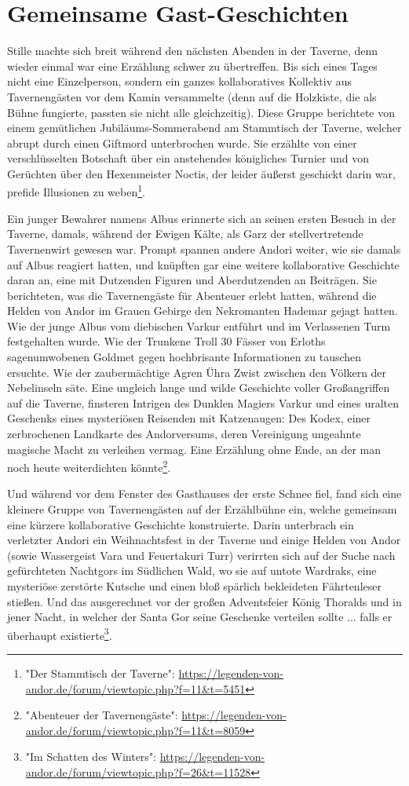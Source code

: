 \section{Gemeinsame Gast-Geschichten}

Stille machte sich breit während den nächsten Abenden in der Taverne, denn wieder einmal war eine Erzählung schwer zu übertreffen. Bis sich eines Tages nicht eine Einzelperson, sondern ein ganzes kollaboratives Kollektiv aus Tavernengästen vor dem Kamin versammelte (denn auf die Holzkiste, die als Bühne fungierte, passten sie nicht alle gleichzeitig). Diese Gruppe berichtete von einem gemütlichen Jubiläums-Sommerabend am Stammtisch der Taverne, welcher abrupt durch einen Giftmord unterbrochen wurde. Sie erzählte von einer verschlüsselten Botschaft über ein anstehendes königliches Turnier und von Gerüchten über den Hexenmeister Noctis, der leider äußerst geschickt darin war, prefide Illusionen zu weben\footnote{"Der Stammtisch der Taverne": \url{https://legenden-von-andor.de/forum/viewtopic.php?f=11&t=5451}}. 

Ein junger Bewahrer namens Albus erinnerte sich an seinen ersten Besuch in der Taverne, damals, während der Ewigen Kälte, als Garz der stellvertretende Tavernenwirt gewesen war. Prompt spannen andere Andori weiter, wie sie damals auf Albus reagiert hatten, und knüpften gar eine weitere kollaborative Geschichte daran an, eine mit Dutzenden Figuren und Aberdutzenden an Beiträgen. Sie berichteten, was die Tavernengäste für Abenteuer erlebt hatten, während die Helden von Andor im Grauen Gebirge den Nekromanten Hademar gejagt hatten. Wie der junge Albus vom diebischen Varkur entführt und im Verlassenen Turm festgehalten wurde. Wie der Trunkene Troll 30 Fässer von Erloths sagenumwobenen Goldmet gegen hochbrisante Informationen zu tauschen ersuchte. Wie der zaubermächtige Agren Ühra Zwist zwischen den Völkern der Nebelinseln säte. Eine ungleich lange und wilde Geschichte voller Großangriffen auf die Taverne, finsteren Intrigen des Dunklen Magiers Varkur und eines uralten Geschenks eines mysteriösen Reisenden mit Katzenaugen: Des Kodex, einer zerbrochenen Landkarte des Andorversums, deren Vereinigung ungeahnte magische Macht zu verleihen vermag. Eine Erzählung ohne Ende, an der man noch heute weiterdichten könnte\footnote{"Abenteuer der Tavernengäste": \url{https://legenden-von-andor.de/forum/viewtopic.php?f=11&t=8059}}.

Und während vor dem Fenster des Gasthauses der erste Schnee fiel, fand sich eine kleinere Gruppe von Tavernengästen auf der Erzählbühne ein, welche gemeinsam eine kürzere kollaborative Geschichte konstruierte. Darin unterbrach ein verletzter Andori ein Weihnachtsfest in der Taverne und einige Helden von Andor (sowie Wassergeist Vara und Feuertakuri Turr) verirrten sich auf der Suche nach gefürchteten Nachtgors im Südlichen Wald, wo sie auf untote Wardraks, eine mysteriöse zerstörte Kutsche und einen bloß spärlich bekleideten Fährtenleser stießen. Und das ausgerechnet vor der großen Adventsfeier König Thoralds und in jener Nacht, in welcher der Santa Gor seine Geschenke verteilen sollte ... falls er überhaupt existierte\footnote{"Im Schatten des Winters": \url{https://legenden-von-andor.de/forum/viewtopic.php?f=26&t=11528}}.


